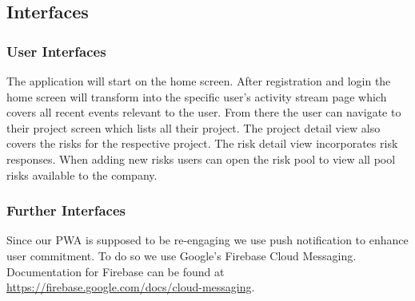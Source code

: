 \subsection{Interfaces}
\label{sec:domainBe}

\subsubsection{User Interfaces}
\label{sec:domainBea}
The application will start on the home screen. After registration and login the home screen will transform into the specific user's activity stream page which covers all recent events relevant to the user. From there the user can navigate to their project screen which lists all their project. The project detail view also covers the risks for the respective project. The risk detail view incorporates risk responses.
When adding new risks users can open the risk pool to view all pool risks available to the company.
\subsubsection{Further Interfaces}
\label{sec:domainBeb}
Since our PWA is supposed to be re-engaging we use push notification to enhance user commitment. To do so we use Google's Firebase Cloud Messaging. Documentation for Firebase can be found at \href{https://firebase.google.com/docs/cloud-messaging}{https://firebase.google.com/docs/cloud-messaging}.


